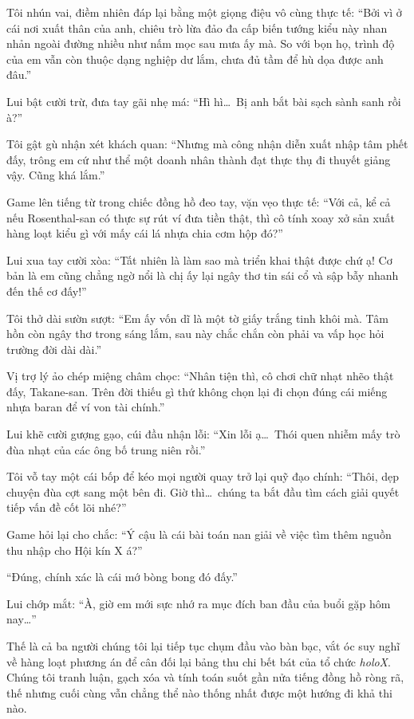 \documentclass[../main.tex]{subfiles}
\begin{document}
Tôi nhún vai, điềm nhiên đáp lại bằng một giọng điệu vô cùng thực tế: ``Bởi vì ở cái nơi xuất thân của anh, chiêu trò lừa đảo đa cấp biến tướng kiểu này nhan nhản ngoài đường nhiều như nấm mọc sau mưa ấy mà. So với bọn họ, trình độ của em vẫn còn thuộc dạng nghiệp dư lắm, chưa đủ tầm để hù dọa được anh đâu.''

Lui bật cười trừ, đưa tay gãi nhẹ má: ``Hì hì\dots\ Bị anh bắt bài sạch sành sanh rồi à?''

Tôi gật gù nhận xét khách quan: ``Nhưng mà công nhận diễn xuất nhập tâm phết đấy, trông em cứ như thể một doanh nhân thành đạt thực thụ đi thuyết giảng vậy. Cũng khá lắm.''

Game lên tiếng từ trong chiếc đồng hồ đeo tay, vặn vẹo thực tế: ``Với cả, kể cả nếu Rosenthal-san có thực sự rút ví đưa tiền thật, thì cô tính xoay xở sản xuất hàng loạt kiểu gì với mấy cái lá nhựa chia cơm hộp đó?''

Lui xua tay cười xòa: ``Tất nhiên là làm sao mà triển khai thật được chứ ạ! Cơ bản là em cũng chẳng ngờ nổi là chị ấy lại ngây thơ tin sái cổ và sập bẫy nhanh đến thế cơ đấy!''

Tôi thở dài sườn sượt: ``Em ấy vốn dĩ là một tờ giấy trắng tinh khôi mà. Tâm hồn còn ngây thơ trong sáng lắm, sau này chắc chắn còn phải va vấp học hỏi trường đời dài dài.''

Vị trợ lý ảo chép miệng châm chọc: ``Nhân tiện thì, cô chơi chữ nhạt nhẽo thật đấy, Takane-san. Trên đời thiếu gì thứ không chọn lại đi chọn đúng cái miếng nhựa baran để ví von tài chính.''

Lui khẽ cười gượng gạo, cúi đầu nhận lỗi: ``Xin lỗi ạ\dots\ Thói quen nhiễm mấy trò đùa nhạt của các ông bố trung niên rồi.''

Tôi vỗ tay một cái bốp để kéo mọi người quay trở lại quỹ đạo chính: ``Thôi, dẹp chuyện đùa cợt sang một bên đi. Giờ thì\dots\ chúng ta bắt đầu tìm cách giải quyết tiếp vấn đề cốt lõi nhé?''

Game hỏi lại cho chắc: ``Ý cậu là cái bài toán nan giải về việc tìm thêm nguồn thu nhập cho Hội kín X á?''

``Đúng, chính xác là cái mớ bòng bong đó đấy.''

Lui chớp mắt: ``À, giờ em mới sực nhớ ra mục đích ban đầu của buổi gặp hôm nay\dots''

Thế là cả ba người chúng tôi lại tiếp tục chụm đầu vào bàn bạc, vắt óc suy nghĩ về hàng loạt phương án để cân đối lại bảng thu chi bết bát của tổ chức \textit{holoX}. Chúng tôi tranh luận, gạch xóa và tính toán suốt gần nửa tiếng đồng hồ ròng rã, thế nhưng cuối cùng vẫn chẳng thể nào thống nhất được một hướng đi khả thi nào.
\end{document}
